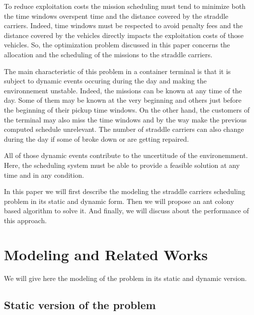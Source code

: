 \documentclass[a4paper,10pt]{article}
\begin{document}
To reduce exploitation costs the mission scheduling must tend to minimize both the time windows overspent time and the distance covered by the straddle carriers. Indeed, time windows must be respected to avoid penalty fees and the distance covered by the vehicles directly impacts the exploitation costs of those vehicles. %
So, the optimization problem discussed in this paper concerns the allocation and the scheduling of the missions to the straddle carriers.

The main characteristic of this problem in a container terminal is that it is subject to dynamic events occuring during the day and making the environnement unstable. Indeed, the missions can be known at any time of the day. Some of them may be known at the very beginning and others just before the beginning of their pickup time windows. On the other hand, the customers of the terminal may also miss the time windows and by the way make the previous computed schedule unrelevant. The number of straddle carriers can also change during the day if some of broke down or are getting repaired.

All of those dynamic events contribute to the uncertitude of the environemment. Here, the scheduling system must be able to provide a feasible solution at any time and in any condition.


In this paper we will first describe the modeling the straddle carriers scheduling problem in its static and dynamic form. Then we will propose an ant colony based algorithm to solve it. And finally, we will discuss about the performance of this approach.

\section{Modeling and Related Works}

We will give here the modeling of the problem in its static and dynamic version.

    \subsection{Static version of the problem}
\end{document}
